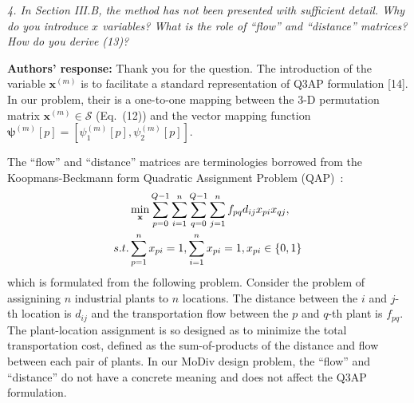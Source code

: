 \documentclass[onecolumn, 11pt, draftclsnofoot]{IEEEtran}
\begin{document}
\noindent
\emph{4. In Section III.B, the method has not been presented with sufficient
detail. Why do you introduce $x$ variables? What is the role of ``flow'' and
``distance'' matrices? How do you derive (13)?}

\noindent \textbf{Authors' response:}
Thank you for the question. The introduction of the variable $\mathbf{x}^{(m)}$
is to facilitate a standard representation of Q3AP formulation
[14]\citep[R][]{frieze1974bilinear}\citep[R][]{balas1991algorithm}\citep[R][]{burkard1999linear}\citep[R][]{5587019}.
In our problem, their is a one-to-one mapping between the 3-D permutation matrix
$\mathbf{x}^{(m)}\in\mathcal{S}$ (Eq.~(12)) and the vector mapping function
$\bm{\psi}^{(m)}[p] = [\psi_1^{(m)}[p], \psi_2^{(m)}[p]]$. 

The ``flow'' and ``distance'' matrices are terminologies borrowed from the
Koopmans-Beckmann form Quadratic Assignment Problem
(QAP)~\citep[R][]{koopmans1957assignment}\citep[R][]{806935}:
\begin{align}
  & \min_{\mathbf{x}}
  \sum_{p=0}^{Q-1}\sum_{i=1}^{n}
  \sum_{q=0}^{Q-1}\sum_{j=1}^{n}
  f_{pq}d_{ij}x_{pi}x_{qj},\notag\\
  \mbox{s.t. } & \sum_{p=1}^{n}x_{pi} =
  1,\sum_{i=1}^{n}x_{pi} = 1, x_{pi}\in\{0, 1\}
\end{align}
which is formulated from the following problem. Consider the problem of
assignining $n$ industrial plants to $n$ locations. The distance between the $i$
and $j$-th location is $d_{ij}$ and the transportation flow between the $p$ and
$q$-th plant is $f_{pq}$. The plant-location assignment is so designed as to
minimize the total transportation cost, defined as the sum-of-products of the
distance and flow between each pair of plants. In our MoDiv design problem, the
``flow'' and ``distance'' do not have a concrete meaning and does not affect
the Q3AP formulation.
\end{document}
